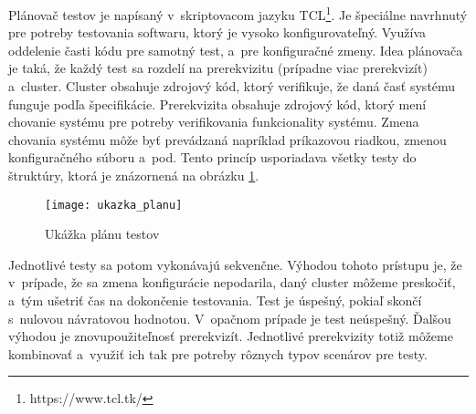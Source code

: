 Plánovač testov je napísaný v~skriptovacom jazyku TCL\footnote{https://www.tcl.tk/}. 
Je špeciálne navrhnutý pre potreby testovania softwaru, ktorý je vysoko konfigurovateľný. 
Využíva oddelenie časti kódu pre samotný test, a~pre konfiguračné zmeny. 
Idea plánovača je taká, že každý test sa rozdelí na prerekvizitu (prípadne viac prerekvizít) a~cluster. Cluster obsahuje zdrojový kód, ktorý verifikuje, že daná
časť systému funguje podľa špecifikácie. Prerekvizita obsahuje zdrojový kód, ktorý mení chovanie systému pre potreby verifikovania funkcionality systému.
Zmena chovania systému môže byť prevádzaná napríklad príkazovou riadkou, zmenou konfiguračného súboru a~pod.
Tento princíp usporiadava všetky testy do štruktúry, ktorá je znázornená na obrázku \ref{figure:ukazka_planu}.
\begin{figure}[h]
	\begin{center}
    \texttt{[image: ukazka\_planu]}
    \caption{Ukážka plánu testov}
    \label{figure:ukazka_planu}
    \end{center}
\end{figure}

Jednotlivé testy sa potom vykonávajú sekvenčne. Výhodou tohoto prístupu je, že v~prípade, že sa zmena konfigurácie nepodarila,
daný cluster môžeme preskočiť, a~tým ušetriť čas na dokončenie testovania. 
Test je úspešný, pokiaľ skončí s~nulovou návratovou hodnotou. V~opačnom prípade je test neúspešný. 
Ďalšou výhodou je znovupoužiteľnosť prerekvizít. 
Jednotlivé prerekvizity totiž môžeme kombinovať a~využiť ich tak pre potreby rôznych typov scenárov pre testy. 

